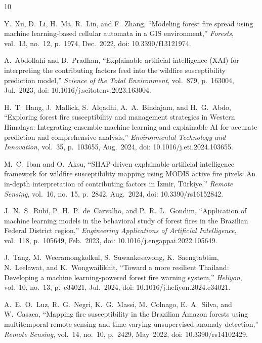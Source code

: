 \documentclass[12pt,a4paper]{article}
\begin{document}
\begin{thebibliography}{10}

Y.~Xu, D.~Li, H.~Ma, R.~Lin, and F.~Zhang,
``Modeling forest fire spread using machine learning-based cellular automata in a GIS environment,''
\textit{Forests}, vol.~13, no.~12, p.~1974, Dec.~2022,
doi: 10.3390/f13121974.

A.~Abdollahi and B.~Pradhan,
``Explainable artificial intelligence (XAI) for interpreting the contributing factors feed into the wildfire susceptibility prediction model,''
\textit{Science of the Total Environment}, vol.~879, p.~163004, Jul.~2023,
doi: 10.1016/j.scitotenv.2023.163004.

H.~T.~Hang, J.~Mallick, S.~Alqadhi, A.~A.~Bindajam, and H.~G.~Abdo,
``Exploring forest fire susceptibility and management strategies in Western Himalaya: Integrating ensemble machine learning and explainable AI for accurate prediction and comprehensive analysis,''
\textit{Environmental Technology and Innovation}, vol.~35, p.~103655, Aug.~2024,
doi: 10.1016/j.eti.2024.103655.

M.~C.~Iban and O.~Aksu,
``SHAP-driven explainable artificial intelligence framework for wildfire susceptibility mapping using MODIS active fire pixels: An in-depth interpretation of contributing factors in Izmir, T\"{u}rkiye,''
\textit{Remote Sensing}, vol.~16, no.~15, p.~2842, Aug.~2024,
doi: 10.3390/rs16152842.

J.~N.~S.~Rub\'{i}, P.~H.~P.~de~Carvalho, and P.~R.~L.~Gondim,
``Application of machine learning models in the behavioral study of forest fires in the Brazilian Federal District region,''
\textit{Engineering Applications of Artificial Intelligence}, vol.~118, p.~105649, Feb.~2023,
doi: 10.1016/j.engappai.2022.105649.

J.~Tang, M.~Weeramongkolkul, S.~Suwankesawong, K.~Saengtabtim, N.~Leelawat, and K.~Wongwailikhit,
``Toward a more resilient Thailand: Developing a machine learning-powered forest fire warning system,''
\textit{Heliyon}, vol.~10, no.~13, p.~e34021, Jul.~2024,
doi: 10.1016/j.heliyon.2024.e34021.

A.~E.~O.~Luz, R.~G.~Negri, K.~G.~Massi, M.~Colnago, E.~A.~Silva, and W.~Casaca,
``Mapping fire susceptibility in the Brazilian Amazon forests using multitemporal remote sensing and time-varying unsupervised anomaly detection,''
\textit{Remote Sensing}, vol.~14, no.~10, p.~2429, May~2022,
doi: 10.3390/rs14102429.


\end{thebibliography}
\end{document}
